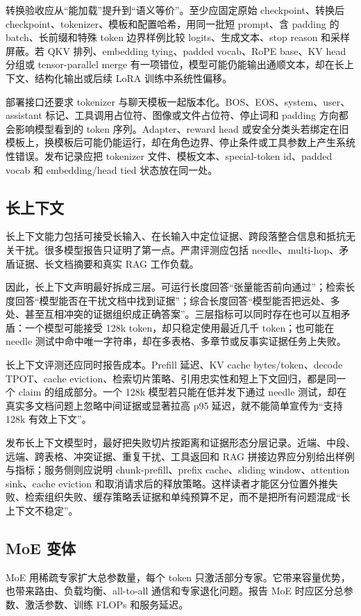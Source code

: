 \documentclass[UTF8,zihao=-4,openany]{ctexbook}
\begin{document}
转换验收应从“能加载”提升到“语义等价”。至少应固定原始 checkpoint、转换后 checkpoint、tokenizer、模板和配置哈希，用同一批短 prompt、含 padding 的 batch、长前缀和特殊 token 边界样例比较 logits、生成文本、stop reason 和采样屏蔽。若 QKV 排列、embedding tying、padded vocab、RoPE base、KV head 分组或 tensor-parallel merge 有一项错位，模型可能仍能输出通顺文本，却在长上下文、结构化输出或后续 LoRA 训练中系统性偏移。

部署接口还要求 tokenizer 与聊天模板一起版本化。BOS、EOS、system、user、assistant 标记、工具调用占位符、图像或文件占位符、停止词和 padding 方向都会影响模型看到的 token 序列。Adapter、reward head 或安全分类头若绑定在旧模板上，换模板后可能仍能运行，却在角色边界、停止条件或工具参数上产生系统性错误。发布记录应把 tokenizer 文件、模板文本、special-token id、padded vocab 和 embedding/head tied 状态放在同一处。

\subsection{长上下文}
长上下文能力包括可接受长输入、在长输入中定位证据、跨段落整合信息和抵抗无关干扰。很多模型报告只证明了第一点。严肃评测应包括 needle、multi-hop、矛盾证据、长文档摘要和真实 RAG 工作负载。

因此，长上下文声明最好拆成三层。可运行长度回答“张量能否前向通过”；检索长度回答“模型能否在干扰文档中找到证据”；综合长度回答“模型能否把远处、多处、甚至互相冲突的证据组织成正确答案”。三层指标可以同时存在也可以互相矛盾：一个模型可能接受 128k token，却只稳定使用最近几千 token；也可能在 needle 测试中命中唯一字符串，却在多表格、多章节或反事实证据任务上失败。

长上下文评测还应同时报告成本。Prefill 延迟、KV cache bytes/token、decode TPOT、cache eviction、检索切片策略、引用忠实性和短上下文回归，都是同一个 claim 的组成部分。一个 128k 模型若只能在低并发下通过 needle 测试，却在真实多文档问题上忽略中间证据或显著拉高 p95 延迟，就不能简单宣传为“支持 128k 有效上下文”。

发布长上下文模型时，最好把失败切片按距离和证据形态分层记录。近端、中段、远端、跨表格、冲突证据、重复干扰、工具返回和 RAG 拼接边界应分别给出样例与指标；服务侧则应说明 chunk-prefill、prefix cache、sliding window、attention sink、cache eviction 和取消请求后的释放策略。这样读者才能区分位置外推失败、检索组织失败、缓存策略丢证据和单纯预算不足，而不是把所有问题混成“长上下文不稳定”。

\subsection{MoE 变体}
MoE 用稀疏专家扩大总参数量，每个 token 只激活部分专家。它带来容量优势，也带来路由、负载均衡、all-to-all 通信和专家退化问题。报告 MoE 时应区分总参数、激活参数、训练 FLOPs 和服务延迟。
\end{document}
